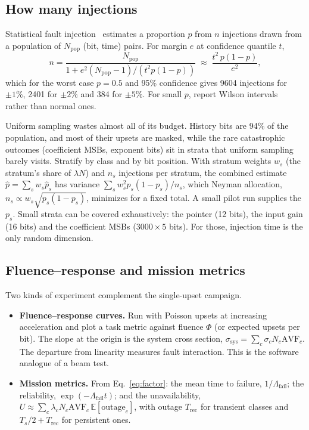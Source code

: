 \documentclass[11pt,a4paper]{article}
\newcommand{\E}{\mathbb{E}}
\newcommand{\AVF}{\mathrm{AVF}}
\begin{document}
\subsection{How many injections}

Statistical fault injection~\cite{leveugle2009} estimates a proportion $p$ from $n$ injections drawn from a population of $N_{\mathrm{pop}}$ (bit, time) pairs. For margin $e$ at confidence quantile $t$,
\begin{equation}
n = \frac{N_{\mathrm{pop}}}{1 + e^2 (N_{\mathrm{pop}} - 1)/(t^2 p(1-p))} \;\approx\; \frac{t^2\, p(1-p)}{e^2},
\label{eq:samplesize}
\end{equation}
which for the worst case $p = 0.5$ and 95\% confidence gives 9604 injections for $\pm1\%$, 2401 for $\pm2\%$ and 384 for $\pm5\%$. For small $p$, report Wilson intervals~\cite{wilson1927} rather than normal ones.

Uniform sampling wastes almost all of its budget. History bits are 94\% of the population, and most of their upsets are masked, while the rare catastrophic outcomes (coefficient MSBs, exponent bits) sit in strata that uniform sampling barely visits. Stratify by class and by bit position. With stratum weights $w_s$ (the stratum's share of $\lambda N$) and $n_s$ injections per stratum, the combined estimate $\hat p = \sum_s w_s \hat p_s$ has variance $\sum_s w_s^2 p_s(1-p_s)/n_s$, which Neyman allocation, $n_s \propto w_s\sqrt{p_s(1-p_s)}$, minimizes for a fixed total. A small pilot run supplies the $p_s$. Small strata can be covered exhaustively: the pointer (12 bits), the input gain (16 bits) and the coefficient MSBs ($3000 \times 5$ bits). For those, injection time is the only random dimension.

\subsection{Fluence--response and mission metrics}

Two kinds of experiment complement the single-upset campaign.
\begin{itemize}
  \item \textbf{Fluence--response curves.} Run with Poisson upsets at increasing acceleration and plot a task metric against fluence $\Phi$ (or expected upsets per bit). The slope at the origin is the system cross section, $\sigma_{\mathrm{sys}} = \sum_c \sigma_c N_c \AVF_c$. The departure from linearity measures fault interaction. This is the software analogue of a beam test.
  \item \textbf{Mission metrics.} From Eq.~\eqref{eq:factor}: the mean time to failure, $1/\Lambda_{\mathrm{fail}}$; the reliability, $\exp(-\Lambda_{\mathrm{fail}}t)$; and the unavailability, $U \approx \sum_c \lambda_c N_c \AVF_c\, \E[\mathrm{outage}_c]$, with outage $T_{\mathrm{rec}}$ for transient classes and $T_s/2 + T_{\mathrm{rec}}$ for persistent ones.
\end{itemize}
\end{document}
